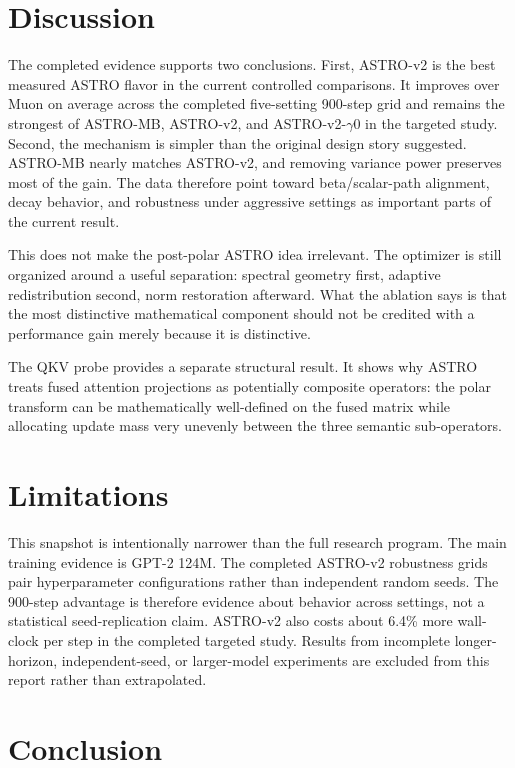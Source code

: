 \documentclass[10pt,twocolumn]{article}
\begin{document}
\section{Discussion}

The completed evidence supports two conclusions. First, ASTRO-v2 is the best
measured ASTRO flavor in the current controlled comparisons. It improves over
Muon on average across the completed five-setting 900-step grid and remains the
strongest of ASTRO-MB, ASTRO-v2, and ASTRO-v2-$\gamma0$ in the targeted study.
Second, the mechanism is simpler than the original design story suggested.
ASTRO-MB nearly matches ASTRO-v2, and removing variance power preserves most of
the gain. The data therefore point toward beta/scalar-path alignment, decay
behavior, and robustness under aggressive settings as important parts of the
current result.

This does not make the post-polar ASTRO idea irrelevant. The optimizer is still
organized around a useful separation: spectral geometry first, adaptive
redistribution second, norm restoration afterward. What the ablation says is
that the most distinctive mathematical component should not be credited with a
performance gain merely because it is distinctive.

The QKV probe provides a separate structural result. It shows why ASTRO treats
fused attention projections as potentially composite operators: the polar
transform can be mathematically well-defined on the fused matrix while
allocating update mass very unevenly between the three semantic sub-operators.

\section{Limitations}

This snapshot is intentionally narrower than the full research program. The
main training evidence is GPT-2 124M. The completed ASTRO-v2 robustness grids
pair hyperparameter configurations rather than independent random seeds. The
900-step advantage is therefore evidence about behavior across settings, not a
statistical seed-replication claim. ASTRO-v2 also costs about 6.4\% more
wall-clock per step in the completed targeted study. Results from incomplete
longer-horizon, independent-seed, or larger-model experiments are excluded from
this report rather than extrapolated.

\section{Conclusion}
\end{document}
